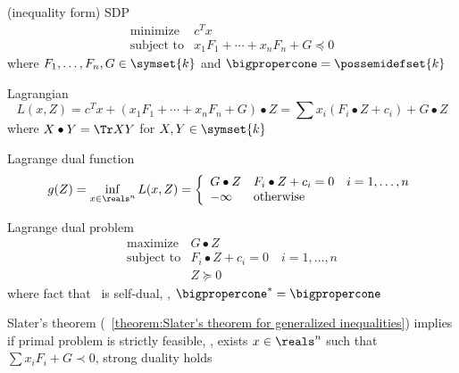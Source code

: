 \documentclass[17pt,landscape]{foils}
\begin{document}
{

\bit
\item
	(inequality form) SDP%
	$$
		\begin{array}{ll}
			\mbox{minimize} &
				c^Tx
			\\
			\mbox{subject to} &
				x_1F_1 + \cdots + x_nF_n + G \preceq 0
		\end{array}
	$$
	where $F_1,\ldots,F_n,G\in\symset{k}$
	and $\bigpropercone = \possemidefset{k}$

\vitem
	Lagrangian
	$$
		L(x,Z)
		= c^Tx + (x_1F_1 + \cdots + x_nF_n + G) \bullet Z
		= \sum x_i(F_i\bullet Z + c_i) + G \bullet Z
	$$
	where $X\bullet Y = \Tr XY$ for $X,Y\in\symset{k}$

\vitem
	Lagrange dual function
	$$
		g(Z) = \inf_{x\in\reals^n} L(x,Z)
		=
		\left\{
		\begin{array}{ll}
			G \bullet Z & F_i\bullet Z + c_i= 0\quad i=1,\ldots,n
			\\
			-\infty & \mbox{otherwise}
		\end{array}
		\right.
	$$

\vitem
	Lagrange dual problem%
	$$
		\begin{array}{ll}
			\mbox{maximize} &
				G\bullet Z
			\\
			\mbox{subject to} &
				F_i \bullet Z + c_i = 0\quad i=1,\ldots,n
			\\ &
				Z \succeq 0
		\end{array}
	$$
	where fact that \ is self-dual,
	\ie,
	$\bigpropercone^\ast = \bigpropercone$

\vitem
	Slater's theorem (\theoremname~\ref{theorem:Slater's theorem for generalized inequalities})
	implies if primal problem is strictly feasible,
	\ie,
	exists $x\in\reals^n$ such that $\sum x_iF_i + G\prec 0$,
	strong duality holds
\eit



}
\end{document}
